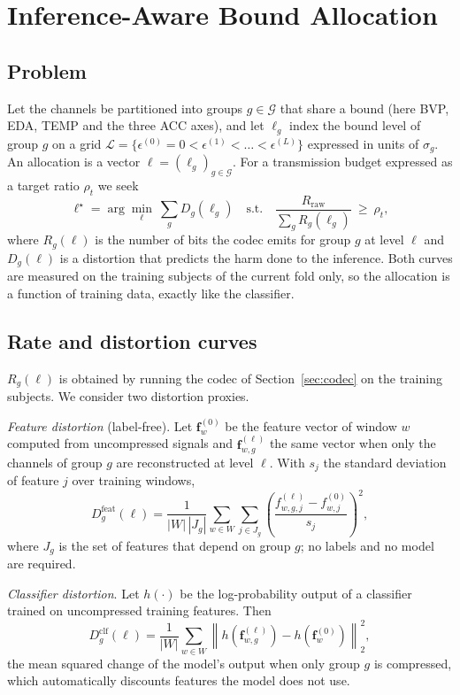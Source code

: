 \documentclass[journal,twoside,web]{ieeecolor}
\begin{document}
\section{Inference-Aware Bound Allocation}
\label{sec:alloc}
\subsection{Problem}
Let the channels be partitioned into groups $g\in\mathcal{G}$ that share a bound (here BVP, EDA, TEMP and the three ACC axes), and let $\ell_g$ index the bound level of group $g$ on a grid $\mathcal{L}=\{\epsilon^{(0)}=0<\epsilon^{(1)}<\dots<\epsilon^{(L)}\}$ expressed in units of $\sigma_g$. An allocation is a vector $\boldsymbol{\ell}=(\ell_g)_{g\in\mathcal{G}}$. For a transmission budget expressed as a target ratio $\rho_t$ we seek
\begin{equation}
\boldsymbol{\ell}^\star=\arg\min_{\boldsymbol{\ell}}\ \sum_{g} D_g(\ell_g)\quad\text{s.t.}\quad \frac{R_{\mathrm{raw}}}{\sum_g R_g(\ell_g)}\ \ge\ \rho_t,
\label{eq:alloc}
\end{equation}
where $R_g(\ell)$ is the number of bits the codec emits for group $g$ at level $\ell$ and $D_g(\ell)$ is a distortion that predicts the harm done to the inference. Both curves are measured on the training subjects of the current fold only, so the allocation is a function of training data, exactly like the classifier.

\subsection{Rate and distortion curves}
$R_g(\ell)$ is obtained by running the codec of Section~\ref{sec:codec} on the training subjects. We consider two distortion proxies.

\emph{Feature distortion} (label-free). Let $\mathbf{f}^{(0)}_w$ be the feature vector of window $w$ computed from uncompressed signals and $\mathbf{f}^{(\ell)}_{w,g}$ the same vector when only the channels of group $g$ are reconstructed at level $\ell$. With $s_j$ the standard deviation of feature $j$ over training windows,
\begin{equation}
D^{\mathrm{feat}}_g(\ell)=\frac{1}{|W|\,|J_g|}\sum_{w\in W}\sum_{j\in J_g}\left(\frac{f^{(\ell)}_{w,g,j}-f^{(0)}_{w,j}}{s_j}\right)^2,
\end{equation}
where $J_g$ is the set of features that depend on group $g$; no labels and no model are required.

\emph{Classifier distortion}. Let $h(\cdot)$ be the log-probability output of a classifier trained on uncompressed training features. Then
\begin{equation}
D^{\mathrm{clf}}_g(\ell)=\frac{1}{|W|}\sum_{w\in W}\left\|h(\mathbf{f}^{(\ell)}_{w,g})-h(\mathbf{f}^{(0)}_{w})\right\|_2^2 ,
\end{equation}
the mean squared change of the model's output when only group $g$ is compressed, which automatically discounts features the model does not use.
\end{document}
